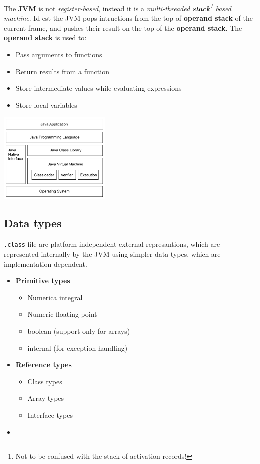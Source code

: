 The \textbf{JVM} is not \textit{register-based}, instead it is a \textit{multi-threaded \textbf{stack}\footnote{Not to be confused with the stack of activation records!} based machine}.
Id est the JVM pops intructions from the top of \textbf{operand stack} of the current frame, and pushes their result on the top of the \textbf{operand stack}. 
The \textbf{operand stack} is used to:
\begin{itemize}
    \item Pass arguments to functions
    \item Return results from a function
    \item Store intermediate values while evaluating expressions
    \item Store local variables
\end{itemize}
\begin{center}
    \includegraphics[width=0.4\textwidth]{images/Java_hierarchy.png}
\end{center}

\subsection{Data types}
\lstinline{.class} file are platform independent external represantions, which are represented internally by the JVM using simpler data types, which are implementation dependent.
\begin{itemize}
    \item \textbf{Primitive types}
    \begin{itemize}
        \item Numerica integral
        \item Numeric floating point
        \item boolean (support only for arrays)
        \item internal (for exception handling)
    \end{itemize}
    \item \textbf{Reference types}
    \begin{itemize}
        \item Class types
        \item Array types
        \item Interface types
    \end{itemize}
    \item[] 
\end{itemize}

